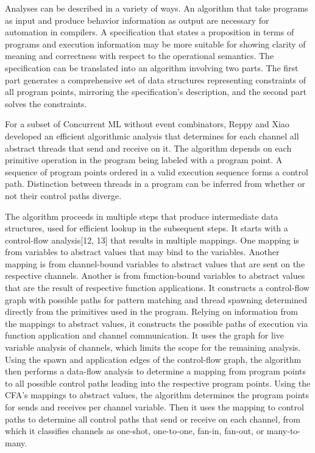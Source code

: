 \documentclass{article}
\begin{document}
Analyses can be described in a variety of ways.  An algorithm that take programs as input and
produce behavior information as output are necessary for automation in compilers.  A
specification that states a proposition in terms of programs and execution information may be
more suitable for showing clarity of meaning and correctness with respect to the operational
semantics.  The specification can be translated into an algorithm involving two parts.  The
first part generates a comprehensive set of data structures representing constraints of all
program points, mirroring the specification's description, and the second part solves the
constraints.

For a subset of Concurrent ML without event combinators, Reppy and  Xiao developed an
efficient algorithmic analysis that determines for each channel all abstract threads that send
and receive on it.  The algorithm depends on each primitive operation in the program being
labeled with a program point.  A sequence of program points ordered in a valid execution
sequence forms a control path.  Distinction between threads in a program can be inferred from
whether or not their control paths diverge.  

The algorithm proceeds in multiple steps that produce intermediate data structures, used for
efficient lookup in the subsequent steps.  It starts with a control-flow analysis[12, 13] that
results in multiple mappings. One mapping is from variables to abstract values that may bind to
the variables.  Another mapping is from channel-bound variables to abstract values that are
sent on the respective channels.  Another is from function-bound variables to abstract values
that are the result of respective function applications.  It constructs a control-flow graph
with possible paths for pattern matching and thread spawning determined directly from the
primitives used in the program.  Relying on information from the mappings to abstract values,
it constructs the possible paths of execution via function application and channel
communication.  It uses the graph for live variable analysis of channels, which limits the
scope for the remaining analysis.  Using the spawn and application edges of the control-flow
graph, the algorithm then performs a data-flow analysis to determine a mapping from program
points to all possible control paths leading into the respective program points.  Using the
CFA's mappings to abstract values, the algorithm determines the program points for sends and
receives per channel variable.  Then it uses the mapping to control paths to determine all
control paths that send or receive on each channel, from which it classifies channels as
one-shot, one-to-one, fan-in, fan-out, or many-to-many.
\end{document}
